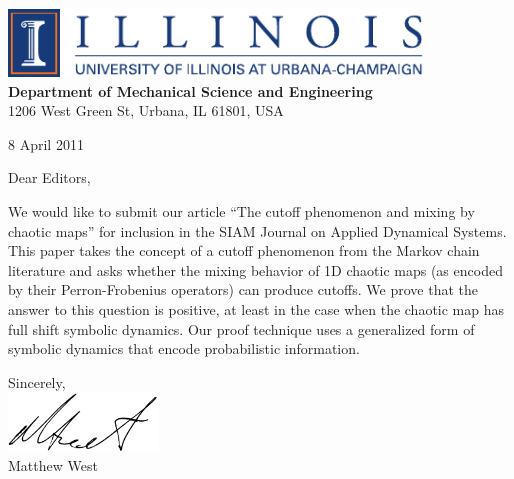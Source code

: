 \documentclass[11pt]{article}
\begin{document}
\hfill
\begin{minipage}{14cm}
\flushright
\includegraphics[width=11cm]{full_mark_horz_bold}\\[1mm]
\textbf{\large Department of Mechanical Science and Engineering}\\
1206 West Green St, Urbana, IL 61801, USA\\
\end{minipage}

\vspace*{0.5cm}

8 April 2011

\vspace*{0.5cm}

Dear Editors,

We would like to submit our article ``The cutoff phenomenon and mixing
by chaotic maps'' for inclusion in the SIAM Journal on Applied
Dynamical Systems. This paper takes the concept of a cutoff phenomenon
from the Markov chain literature and asks whether the mixing behavior
of 1D chaotic maps (as encoded by their Perron-Frobenius operators)
can produce cutoffs. We prove that the answer to this question is
positive, at least in the case when the chaotic map has full shift
symbolic dynamics. Our proof technique uses a generalized form of
symbolic dynamics that encode probabilistic information.

\vspace{1cm}

\hfill
\begin{minipage}{5cm}
Sincerely,\\[0.5em]
\includegraphics[width=4cm]{west_signature}\\
Matthew West
\end{minipage}
\end{document}
